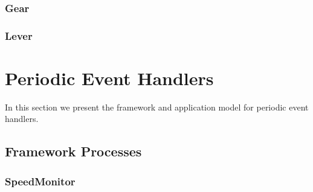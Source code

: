 \documentclass{article}
\begin{document}
\begin{circusbox}

\end{circusbox}

\subsubsection{Gear}

\begin{circusbox}

\end{circusbox}

\subsubsection{Lever}

\begin{circusbox}

\end{circusbox}

\newpage


\section{Periodic Event Handlers}

In this section we present the framework and application model for periodic event handlers.


%

\subsection{Framework Processes}

\subsubsection{SpeedMonitor}

\begin{circusbox}

\end{circusbox}
\end{document}
